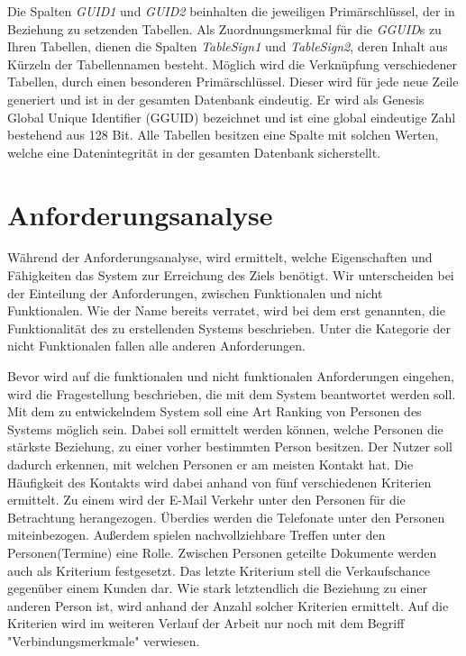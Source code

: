 Die Spalten \textit{GUID1} und \textit{GUID2} beinhalten die jeweiligen Primärschlüssel, der in Beziehung zu setzenden Tabellen. Als Zuordnungsmerkmal für die \textit{GGUID}s zu Ihren Tabellen, dienen die Spalten \textit{TableSign1} und \textit{TableSign2}, deren Inhalt aus Kürzeln der Tabellennamen besteht. Möglich wird die Verknüpfung verschiedener Tabellen, durch einen besonderen Primärschlüssel. Dieser wird für jede neue Zeile generiert und ist in der gesamten Datenbank eindeutig. Er wird als Genesis Global Unique Identifier (GGUID) bezeichnet und ist eine global eindeutige Zahl bestehend aus 128 Bit. Alle Tabellen besitzen eine Spalte mit solchen Werten, welche eine Datenintegrität in der gesamten Datenbank sicherstellt.

\section{Anforderungsanalyse}
\label{ch:Systemanalyse:sec:Anforderungsanalyse}

Während der Anforderungsanalyse, wird ermittelt, welche Eigenschaften und Fähigkeiten das System zur Erreichung des Ziels benötigt. Wir unterscheiden bei der Einteilung der Anforderungen, zwischen Funktionalen und nicht Funktionalen. Wie der Name bereits verratet, wird bei dem erst genannten, die Funktionalität des zu erstellenden Systems beschrieben. Unter die Kategorie der nicht Funktionalen fallen alle anderen Anforderungen. 

Bevor wird auf die funktionalen und nicht funktionalen Anforderungen eingehen, wird die Fragestellung beschrieben, die mit dem System beantwortet werden soll. Mit dem zu entwickelndem System soll eine Art Ranking von Personen des Systems möglich sein. Dabei soll ermittelt werden können, welche Personen die stärkste Beziehung, zu einer vorher bestimmten Person besitzen. Der Nutzer soll dadurch erkennen, mit welchen Personen er am meisten Kontakt hat. Die Häufigkeit des Kontakts wird dabei anhand von fünf verschiedenen Kriterien ermittelt. Zu einem wird der E-Mail Verkehr unter den Personen für die Betrachtung herangezogen. Überdies werden die Telefonate unter den Personen miteinbezogen. Außerdem spielen nachvollziehbare Treffen unter den Personen(Termine) eine Rolle. Zwischen Personen geteilte Dokumente werden auch als Kriterium festgesetzt. Das letzte Kriterium stell die Verkaufschance gegenüber einem Kunden dar. Wie stark letztendlich die Beziehung zu einer anderen Person ist, wird anhand der Anzahl solcher Kriterien ermittelt. Auf die Kriterien wird im weiteren Verlauf der Arbeit nur noch mit dem Begriff "Verbindungsmerkmale" verwiesen.   

